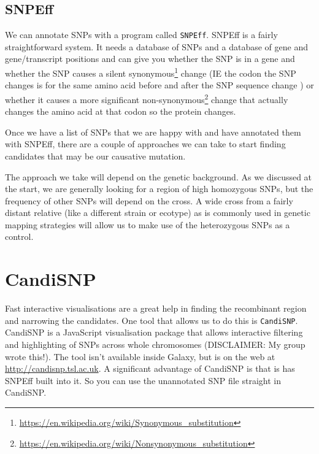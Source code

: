 \documentclass[12pt,]{book}
\let\rmarkdownfootnote\footnote%
\def\footnote{\protect\rmarkdownfootnote}
\renewcommand{\href}[2]{#2\footnote{\url{#1}}}
\begin{document}
\subsection{SNPEff}\label{snpeff}

We can annotate SNPs with a program called \texttt{SNPEff}. SNPEff
\citep{Cingolani:2012cz} is a fairly straightforward system. It needs a
database of SNPs and a database of gene and gene/transcript positions
and can give you whether the SNP is in a gene and whether the SNP causes
a silent
\href{https://en.wikipedia.org/wiki/Synonymous_substitution}{synonymous}
change (IE the codon the SNP changes is for the same amino acid before
and after the SNP sequence change ) or whether it causes a more
significant
\href{https://en.wikipedia.org/wiki/Nonsynonymous_substitution}{non-synonymous}
change that actually changes the amino acid at that codon so the protein
changes.

Once we have a list of SNPs that we are happy with and have annotated
them with SNPEff, there are a couple of approaches we can take to start
finding candidates that may be our causative mutation.

The approach we take will depend on the genetic background. As we
discussed at the start, we are generally looking for a region of high
homozygous SNPs, but the frequency of other SNPs will depend on the
cross. A wide cross from a fairly distant relative (like a different
strain or ecotype) as is commonly used in genetic mapping strategies
will allow us to make use of the heterozygous SNPs as a control.

\section{CandiSNP}\label{candisnp}

Fast interactive visualisations are a great help in finding the
recombinant region and narrowing the candidates. One tool that allows us
to do this is \texttt{CandiSNP}. CandiSNP \citep{Etherington:2014ba} is
a JavaScript visualisation package that allows interactive filtering and
highlighting of SNPs across whole chromosomes (DISCLAIMER: My group
wrote this!). The tool isn't available inside Galaxy, but is on the web
at \url{http://candisnp.tsl.ac.uk}. A significant advantage of CandiSNP
is that is has SNPEff built into it. So you can use the unannotated SNP
file straight in CandiSNP.
\end{document}

